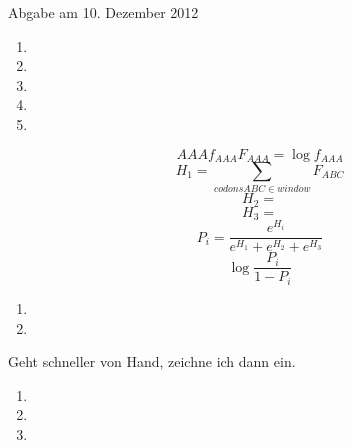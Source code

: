 \documentclass{homework}
\date{Montag, dem 3. Dezember 2012}
\author{Stefan Meißner (4279113) und Niels Hoppe (4356370)}
\begin{document}
\maketitle
\begin{enumerate} 


Abgabe am 10. Dezember 2012

\begin{enumerate}
\item
\item
\item
\item
\item 
\end{enumerate}

$$AAA f_{AAA} F_{AAA} = \log f_{AAA}$$
$$H_1 = \sum_{codons ABC \in window} F_{ABC}$$
$$H_2 = $$
$$H_3 = $$
$$P_i = \frac{e^{H_i}}{e^{H_1} + e^{H_2} + e^{H_3}}$$
$$\log \frac{P_i}{1-P_i}$$

\begin{center}
\setlength{\unitlength}{0.3mm}

\end{center}

\begin{enumerate}
\item
\item
\end{enumerate}


Geht schneller von Hand, zeichne ich dann ein.

\begin{enumerate}
\item
\item
\item
\end{enumerate}

\end{enumerate}
\end{document}
